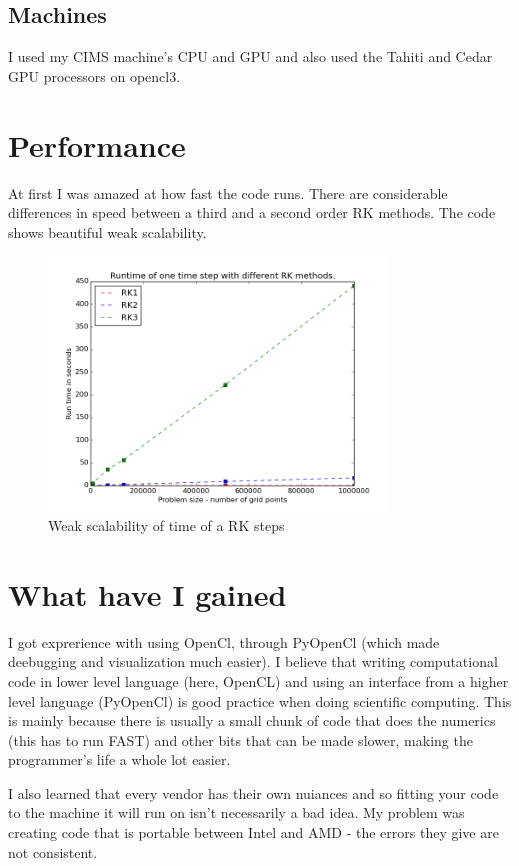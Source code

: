 \documentclass[paper=a4, fontsize=11pt]{scrartcl} %
\numberwithin{equation}{section} %
\numberwithin{figure}{section} %
\numberwithin{table}{section} %
\begin{document}
\subsection{Machines}
I used my CIMS machine's CPU and GPU and also used the Tahiti and Cedar GPU processors on opencl3.



\section{Performance}
At first I was amazed at how fast the code runs. There are considerable differences in speed between a third and a second order RK methods.
The code shows beautiful weak scalability.

\begin{figure}[ht!]
\centering
\includegraphics[width=90mm]{3d.png}
\caption{Weak scalability of time of a RK steps \label{overflow}}
\end{figure}

\section{What have I gained}
I got exprerience with using OpenCl, through PyOpenCl (which made deebugging and visualization much easier). I believe that writing 
computational code in lower level language (here, OpenCL) and using an interface from a higher level language (PyOpenCl) is good
practice when doing scientific computing. This is mainly because there is usually a small chunk of code that does the numerics (this has to 
run FAST) and other bits that can be made slower, making the programmer's life a whole lot easier.

I also learned that every vendor has their own nuiances and so fitting your code to the machine it will run on isn't necessarily
a bad idea. My problem was creating code that is portable between Intel and AMD - the errors they give are not consistent.
\end{document}
